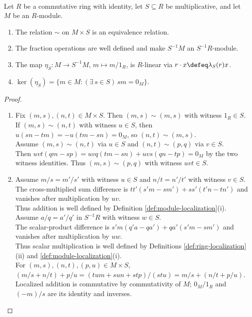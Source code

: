 \begin{proposition} \label{prop:module-localization-construction}
\\
Let $R$ be a commutative ring with identity, let $S\subseteq R$ be multiplicative, and let $M$ be an $R$-module.
\begin{enumerate}[label=(\roman*)]
\setlength{\itemsep}{0pt}
\item The relation $\sim$ on $M\times S$ is an equivalence relation.
\item The fraction operations are well defined and make $S^{-1}M$ an $S^{-1}R$-module.
\item The map $\eta_S:M\to S^{-1}M$, $m\mapsto m/1_R$, is $R$-linear via $r\cdot x\defeq\lambda_S(r)x$.
\item $\ker(\eta_S)=\{m\in M:(\exists\,s\in S)\,sm=0_M\}$.
\end{enumerate}
\begin{proof}
\begin{enumerate}[label=(\roman*)]
\setlength{\itemsep}{0pt}
\item Fix $(m,s),(n,t)\in M\times S$. Then $(m,s)\sim(m,s)$ with witness $1_R\in S$.\\
If $(m,s)\sim(n,t)$ with witness $u\in S$, then $u(sn-tm)=-u(tm-sn)=0_M$, so $(n,t)\sim(m,s)$.\\
Assume $(m,s)\sim(n,t)$ via $u\in S$ and $(n,t)\sim(p,q)$ via $v\in S$.\\
Then $uvt(qm-sp)=uvq(tm-sn)+uvs(qn-tp)=0_M$ by the two witness identities. Thus $(m,s)\sim(p,q)$ with witness $uvt\in S$.
\item Assume $m/s=m'/s'$ with witness $u\in S$ and $n/t=n'/t'$ with witness $v\in S$.\\
The cross-multiplied sum difference is $tt'(s'm-sm')+ss'(t'n-tn')$ and vanishes after multiplication by $uv$.\\
Thus addition is well defined by Definition \ref{def:module-localization}(i). Assume $a/q=a'/q'$ in $S^{-1}R$ with witness $w\in S$.\\
The scalar-product difference is $s'm(q'a-qa')+qa'(s'm-sm')$ and vanishes after multiplication by $uw$.\\
Thus scalar multiplication is well defined by Definitions \ref{def:ring-localization}(ii) and \ref{def:module-localization}(i).\\
For $(m,s),(n,t),(p,u)\in M\times S$, $(m/s+n/t)+p/u=(tu m+su n+st p)/(stu)=m/s+(n/t+p/u)$.\\
Localized addition is commutative by commutativity of $M$; $0_M/1_R$ and $(-m)/s$ are its identity and inverses.\\

\end{enumerate}
\end{proof}
\end{proposition}
